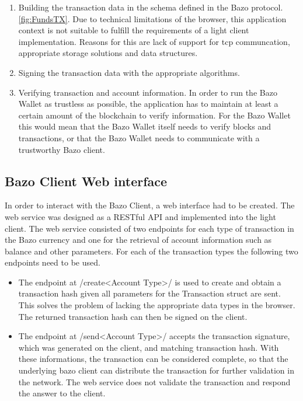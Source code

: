 \begin{enumerate}
\item Building the transaction data in the schema defined in the Bazo protocol. \ref{fig:FundsTX}.
Due to technical limitations of the browser, this application context is not suitable to fulfill the requirements of a light client implementation. Reasons for this are lack of support for tcp communcation, appropriate storage solutions and data structures.

\item Signing the transaction data with the appropriate algorithms.
\item Verifying transaction and account information.
In order to run the Bazo Wallet as trustless as possible, the application has to maintain at least a certain amount of the blockchain to verify information. For the Bazo Wallet this would mean that the Bazo Wallet itself needs to verify blocks and transactions, or that the Bazo Wallet needs to communicate with a trustworthy Bazo client. 
\end{enumerate}


\subsection{Bazo Client Web interface} \label{bazoclientwebinterface}
In order to interact with the Bazo Client, a web interface had to be created. The web service was designed as a RESTful API and implemented into the light client.
The web service consisted of two endpoints for each type of transaction in the Bazo currency and one for the retrieval of account information such as balance and other parameters.
For each of the transaction types the following two endpoints need to be used.
\begin{itemize}
\item The endpoint at /create<Account Type>/ is used to create and obtain a transaction hash given all parameters for the Transaction struct are sent. This solves the problem of lacking the appropriate data types in the browser. The  returned transaction hash can then be signed on the client.
\item The endpoint at /send<Account Type>/ accepts the transaction signature, which was generated on the client, and matching transaction hash. With these informations, the transaction can be considered complete, so that the underlying bazo client can distribute the transaction for further validation in the network. The web service does not validate the transaction and respond the answer to the client.
\end{itemize}  

